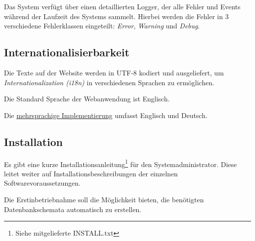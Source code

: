 \begin{description}
	 Das System verfügt über einen detaillierten Logger, der alle Fehler und Events während der Laufzeit des Systems sammelt. Hierbei werden die Fehler in 3 verschiedene Fehlerklassen eingeteilt: \emph{Error}, \emph{Warning} und \emph{Debug}.
\end{description}

\subsection{Internationalisierbarkeit}

\begin{description}
	 Die Texte auf der Website werden in UTF-8 kodiert
	und ausgeliefert, um \textit{Internationalization (i18n)} in verschiedenen Sprachen zu ermöglichen.

	 Die Standard Sprache der Webanwendung ist Englisch.

	 Die \hyperref[funkt:020]{mehrsprachige Implementierung} umfasst Englisch und Deutsch.
 \end{description}

\subsection{Installation}

\begin{description}
	 Es gibt eine kurze Installationsanleitung\footnote{Siehe mitgelieferte INSTALL.txt} für den Systemadministrator. Diese leitet weiter auf Installationsbeschreibungen der einzelnen Softwarevoraussetzungen.

	 Die Erstinbetriebnahme soll die Möglichkeit bieten, die benötigten Datenbankschemata automatisch zu erstellen.
\end{description}
